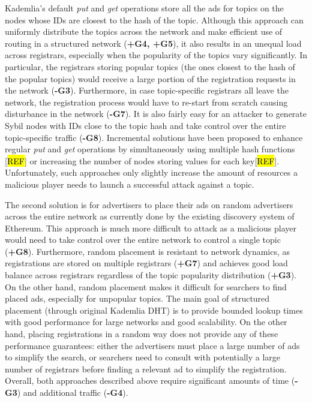 
Kademlia's default \emph{put} and \emph{get} operations store all the ads for topics  on the nodes whose IDs are closest to the hash of the topic. Although this approach can uniformly distribute the topics across the network and make efficient use of routing in a structured network (\textbf{+G4, +G5}), it also results in an unequal load across registrars, especially when the popularity of the topics vary significantly. In particular, the registrars storing popular topics (\ie the ones closest to the hash of the popular topics) would receive a large portion of the registration requests in the network (\textbf{-G3}). Furthermore, in case topic-specific registrars all leave the network, the registration process would have to re-start from scratch causing disturbance in the network (\textbf{-G7}). It is also fairly easy for an attacker to generate Sybil nodes with IDs close to the topic hash and take control over the entire topic-specific traffic (\textbf{-G8}). Incremental solutions have been  proposed to enhance regular \emph{put} and \emph{get} operations by simultaneously using multiple hash functions [\hl{REF}] or increasing the number of nodes storing values for each key[\hl{REF}]. Unfortunately, such approaches only slightly increase the amount of resources a malicious player needs to launch a successful attack against a topic. 

The second solution is for  advertisers to place their ads on random advertisers across the entire network as currently done by the existing discovery system of Ethereum. This approach is much more difficult to attack as a malicious player would need to take control over the entire network to control a single topic (\textbf{+G8}). Furthermore, random placement is resistant to network dynamics, as registrations are stored on multiple registrars (\textbf{+G7}) and achieves good load balance across registrars regardless of the topic popularity distribution (\textbf{+G3}). On the other hand, random placement makes it difficult for searchers to find placed ads, especially for unpopular topics. The main goal of structured placement (through original Kademlia DHT) is to provide bounded lookup times with good performance for large networks and good scalability. On the other hand, placing registrations in a random way does not provide any of these performance guarantees: either the advertisers must place a large number of ads to simplify the search, or searchers need to consult with potentially a large number of registrars before finding a relevant ad to simplify the registration. Overall, both approaches described above require significant amounts of time (\textbf{-G3}) and additional traffic (\textbf{-G4}). 

